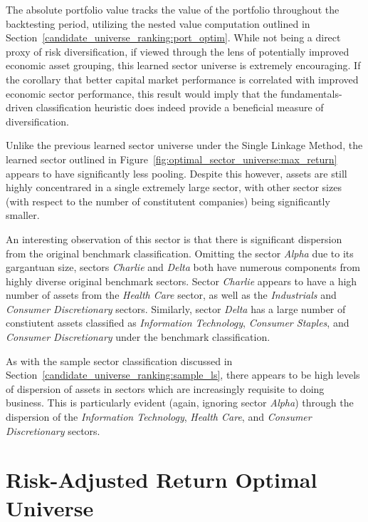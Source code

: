 \documentclass[../main.tex]{subfiles}
\begin{document}
The absolute portfolio value tracks the value of the portfolio throughout the backtesting period, utilizing the nested value computation outlined in Section~\ref{candidate_universe_ranking:port_optim}. While not being a direct proxy of risk diversification, if viewed through the lens of potentially improved economic asset grouping, this learned sector universe is extremely encouraging. If the corollary that better capital market performance is correlated with improved economic sector performance, this result would imply that the fundamentals-driven classification heuristic does indeed provide a beneficial measure of diversification.

Unlike the previous learned sector universe under the Single Linkage Method, the learned sector outlined in Figure~\ref{fig:optimal_sector_universe:max_return} appears to have significantly less pooling. Despite this however, assets are still highly concentrared in a single extremely large sector, with other sector sizes (with respect to the number of constitutent companies) being significantly smaller.

An interesting observation of this sector is that there is significant dispersion from the original benchmark classification. Omitting the sector \textit{Alpha} due to its gargantuan size, sectors \textit{Charlie} and \textit{Delta} both have numerous components from highly diverse original benchmark sectors. Sector \textit{Charlie} appears to have a high number of assets from the \textit{Health Care} sector, as well as the \textit{Industrials} and \textit{Consumer Discretionary} sectors. Similarly, sector \textit{Delta} has a large number of constiutent assets classified as \textit{Information Technology}, \textit{Consumer Staples}, and \textit{Consumer Discretionary} under the benchmark classification.

As with the sample sector classification discussed in Section~\ref{candidate_universe_ranking:sample_ls}, there appears to be high levels of dispersion of assets in sectors which are increasingly requisite to doing business. This is particularly evident (again, ignoring sector \textit{Alpha}) through the dispersion of the \textit{Information Technology}, \textit{Health Care}, and \textit{Consumer Discretionary} sectors.


\section{Risk-Adjusted Return Optimal Universe} \label{optimal_sector_universe:risk_adj_return_optimal}
\end{document}
